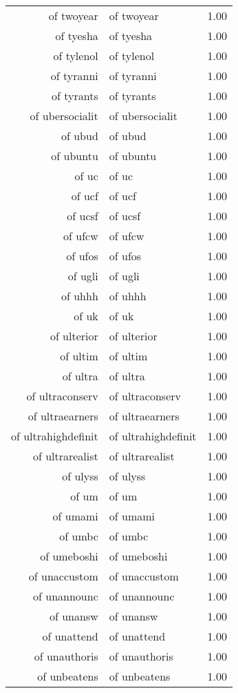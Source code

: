 \begin{table}[ht]
\begin{tabular}{rlr}
  of twoyear & of twoyear & 1.00 \\ 
  of tyesha & of tyesha & 1.00 \\ 
  of tylenol & of tylenol & 1.00 \\ 
  of tyranni & of tyranni & 1.00 \\ 
  of tyrants & of tyrants & 1.00 \\ 
  of ubersocialit & of ubersocialit & 1.00 \\ 
  of ubud & of ubud & 1.00 \\ 
  of ubuntu & of ubuntu & 1.00 \\ 
  of uc & of uc & 1.00 \\ 
  of ucf & of ucf & 1.00 \\ 
  of ucsf & of ucsf & 1.00 \\ 
  of ufcw & of ufcw & 1.00 \\ 
  of ufos & of ufos & 1.00 \\ 
  of ugli & of ugli & 1.00 \\ 
  of uhhh & of uhhh & 1.00 \\ 
  of uk & of uk & 1.00 \\ 
  of ulterior & of ulterior & 1.00 \\ 
  of ultim & of ultim & 1.00 \\ 
  of ultra & of ultra & 1.00 \\ 
  of ultraconserv & of ultraconserv & 1.00 \\ 
  of ultraearners & of ultraearners & 1.00 \\ 
  of ultrahighdefinit & of ultrahighdefinit & 1.00 \\ 
  of ultrarealist & of ultrarealist & 1.00 \\ 
  of ulyss & of ulyss & 1.00 \\ 
  of um & of um & 1.00 \\ 
  of umami & of umami & 1.00 \\ 
  of umbc & of umbc & 1.00 \\ 
  of umeboshi & of umeboshi & 1.00 \\ 
  of unaccustom & of unaccustom & 1.00 \\ 
  of unannounc & of unannounc & 1.00 \\ 
  of unansw & of unansw & 1.00 \\ 
  of unattend & of unattend & 1.00 \\ 
  of unauthoris & of unauthoris & 1.00 \\ 
  of unbeatens & of unbeatens & 1.00 \\ 

\end{tabular}
\end{table}
